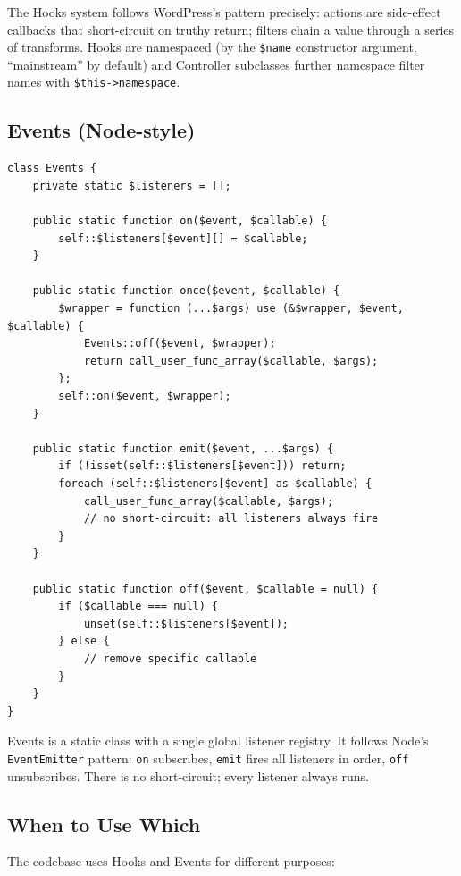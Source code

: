 \documentclass[11pt,a4paper]{article}
\begin{document}
The Hooks system follows WordPress's pattern precisely: actions are
side-effect callbacks that short-circuit on truthy return; filters
chain a value through a series of transforms. Hooks are namespaced
(by the \texttt{\$name} constructor argument, ``mainstream'' by
default) and Controller subclasses further namespace filter names
with \texttt{\$this->namespace}.

\subsection{Events (Node-style)}

\begin{lstlisting}[caption={\texttt{system/library/automation/events.php} --- the Events class (abridged).},label={lst:events}]
class Events {
    private static $listeners = [];

    public static function on($event, $callable) {
        self::$listeners[$event][] = $callable;
    }

    public static function once($event, $callable) {
        $wrapper = function (...$args) use (&$wrapper, $event, $callable) {
            Events::off($event, $wrapper);
            return call_user_func_array($callable, $args);
        };
        self::on($event, $wrapper);
    }

    public static function emit($event, ...$args) {
        if (!isset(self::$listeners[$event])) return;
        foreach (self::$listeners[$event] as $callable) {
            call_user_func_array($callable, $args);
            // no short-circuit: all listeners always fire
        }
    }

    public static function off($event, $callable = null) {
        if ($callable === null) {
            unset(self::$listeners[$event]);
        } else {
            // remove specific callable
        }
    }
}
\end{lstlisting}

Events is a static class with a single global listener registry. It
follows Node's \texttt{EventEmitter} pattern: \texttt{on} subscribes,
\texttt{emit} fires all listeners in order, \texttt{off} unsubscribes.
There is no short-circuit; every listener always runs.

\subsection{When to Use Which}

The codebase uses Hooks and Events for different purposes:
\end{document}

